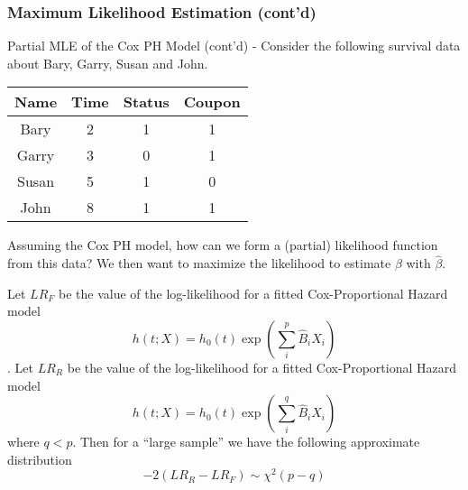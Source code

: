 \documentclass{beamer}
\theoremstyle{definition}
\begin{document}
\begin{frame}
\frametitle{Maximum Likelihood Estimation (cont'd)}
\begin{block}{Partial MLE of the Cox PH Model (cont'd) - }
Consider the following survival data about Bary, Garry, Susan and John. 
\begin{center}
\begin{tabular}{ c c c c } \hline
 Name & Time & Status & Coupon \\ \hline 
Bary & 2 & 1 & 1 \\
 Garry & 3 & 0 & 1 \\
Susan & 5 & 1 & 0 \\
  John & 8 & 1 & 1 \\
\end{tabular}
\end{center}
\end{block}
Assuming the Cox PH model, how can we form a (partial) likelihood function from this data? We then want to maximize the likelihood to estimate $\beta$ with $\hat{\beta}$.   
\end{frame} 


\begin{frame}
 Let $LR_F$ be the value of the log-likelihood for a fitted Cox-Proportional Hazard model
\[ h(t;X) = h_0(t) \exp(\sum_i^p \hat{B}_iX_i) \].
Let $LR_R$ be the value of the log-likelihood for a fitted Cox-Proportional Hazard model
\[ h(t;X) = h_0(t) \exp(\sum_i^q \hat{B}_iX_i) \]
where $q<p$.
Then for a ``large sample'' we have the following approximate distribution
\[
-2(LR_R - LR_F) \sim \chi^2(p-q)
\]
\end{frame}
\end{document}
